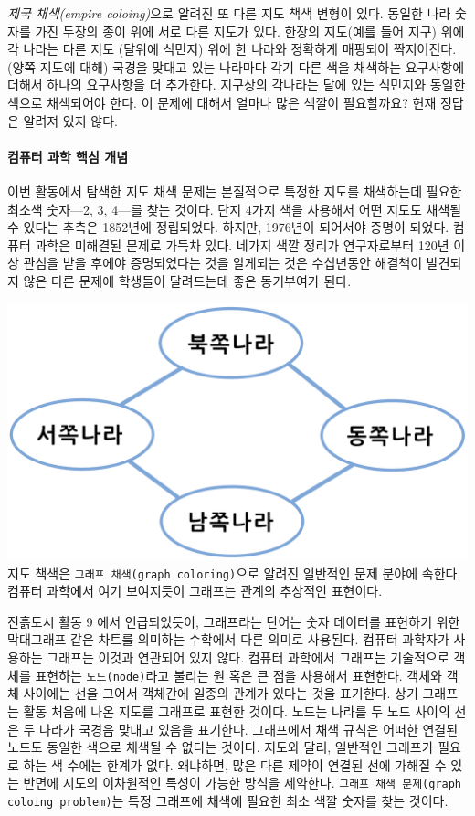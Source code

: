 \documentclass[]{article}
\begin{document}
\emph{제국 채색(empire coloing)}으로 알려진 또 다른 지도 책색 변형이
있다. 동일한 나라 숫자를 가진 두장의 종이 위에 서로 다른 지도가 있다.
한장의 지도(예를 들어 지구) 위에 각 나라는 다른 지도 (달위에 식민지)
위에 한 나라와 정확하게 매핑되어 짝지어진다. (양쪽 지도에 대해) 국경을
맞대고 있는 나라마다 각기 다른 색을 채색하는 요구사항에 더해서 하나의
요구사항을 더 추가한다. 지구상의 각나라는 달에 있는 식민지와 동일한
색으로 채색되어야 한다. 이 문제에 대해서 얼마나 많은 색깔이 필요할까요?
현재 정답은 알려져 있지 않다.

\mbox{}\paragraph{컴퓨터 과학 핵심 개념}\label{section-195}

이번 활동에서 탐색한 지도 채색 문제는 본질적으로 특정한 지도를
채색하는데 필요한 최소색 숫자---2, 3, 4---를 찾는 것이다. 단지 4가지
색을 사용해서 어떤 지도도 채색될 수 있다는 추측은 1852년에 정립되었다.
하지만, 1976년이 되어서야 증명이 되었다. 컴퓨터 과학은 미해결된 문제로
가득차 있다. 네가지 색깔 정리가 연구자로부터 120년 이상 관심을 받을
후에야 증명되었다는 것을 알게되는 것은 수십년동안 해결책이 발견되지 않은
다른 문제에 학생들이 달려드는데 좋은 동기부여가 된다.

\includegraphics{csunplugged/04-part/img/ch14-coloring/13-coloring-07-four-lands.png}
지도 책색은 \texttt{그래프 채색(graph coloring)}으로 알려진 일반적인
문제 분야에 속한다. 컴퓨터 과학에서 여기 보여지듯이 그래프는 관계의
추상적인 표현이다.

진흙도시 활동 9 에서 언급되었듯이, 그래프라는 단어는 숫자 데이터를
표현하기 위한 막대그래프 같은 차트를 의미하는 수학에서 다른 의미로
사용된다. 컴퓨터 과학자가 사용하는 그래프는 이것과 연관되어 있지 않다.
컴퓨터 과학에서 그래프는 기술적으로 객체를 표현하는
\texttt{노드(node)}라고 불리는 원 혹은 큰 점을 사용해서 표현한다. 객체와
객체 사이에는 선을 그어서 객체간에 일종의 관계가 있다는 것을 표기한다.
상기 그래프는 활동 처음에 나온 지도를 그래프로 표현한 것이다. 노드는
나라를 두 노드 사이의 선은 두 나라가 국경음 맞대고 있음을 표기한다.
그래프에서 채색 규칙은 어떠한 연결된 노드도 동일한 색으로 채색될 수
없다는 것이다. 지도와 달리, 일반적인 그래프가 필요로 하는 색 수에는
한계가 없다. 왜냐하면, 많은 다른 제약이 연결된 선에 가해질 수 있는
반면에 지도의 이차원적인 특성이 가능한 방식을 제약한다.
\texttt{그래프 채색 문제(graph coloing problem)}는 특정 그래프에 채색에
필요한 최소 색깔 숫자를 찾는 것이다.
\end{document}
